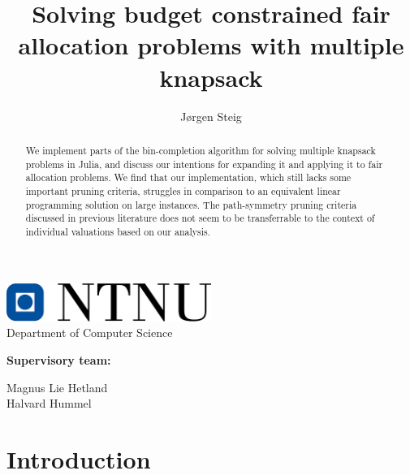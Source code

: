 \documentclass[b5paper]{article}
\title{Solving budget constrained fair allocation problems with multiple knapsack}
\author{Jørgen Steig}
\begin{document}
\maketitle

\begin{center}
    \includegraphics[width=0.5\textwidth]{ntnu.PNG}
    \\
    Department of Computer Science 
\end{center}

\vspace{10mm}

\begin{abstract}
    \noindent
    We implement parts of the bin-completion algorithm \cite{fukunaga_branch-and-bound_2011}
    for solving multiple knapsack problems in Julia, and discuss our intentions for expanding it and applying it to fair allocation problems.
    We find that our implementation, which still lacks some important pruning criteria,
    struggles in comparison to an equivalent linear programming solution on large instances.
    The path-symmetry pruning criteria discussed in previous literature does not seem to
    be transferrable to the context of individual valuations based on our analysis.
\end{abstract}

\vspace{20mm}
\begin{center}
    \begin{large}
    \bf Supervisory team: \\
    \end{large}
    \vspace{3mm}
    Magnus Lie Hetland\\
    \vspace{1mm}
    Halvard Hummel\\
\end{center}


\newpage
\renewcommand*\contentsname{Table of Contents}
\tableofcontents

\newpage
\section{Introduction}
\end{document}
